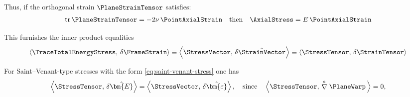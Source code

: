Thus, if the orthogonal strain \(\PlaneStrainTensor\) satisfies:
\begin{equation*}
\operatorname{tr}\PlaneStrainTensor = -2\nu\,\PointAxialStrain
\quad\text{then}\quad 
\AxialStress = E\,\PointAxialStrain
\end{equation*}


This furnishes the inner product equalities
\begin{equation*}
\left<\TraceTotalEnergyStress,\,\delta\FrameStrain\right>
\equiv \left<\StressVector,\, \delta \hat{\StrainVector}\right>
\equiv \left<\StressTensor ,\,\delta\StrainTensor\right>
\end{equation*}

For Saint–Venant-type stresses with the form \eqref{eq:saint-venant-stress} one has
\begin{equation}
\left<\StressTensor,\,\delta\hat{\bm{E}}\right>
=\left<\StressVector,\,\delta\hat{\bm{\varepsilon}}\right>,
\quad\text{since}\quad
\left<\StressTensor,\,\stackrel{\rm s}{\nabla}\PlaneWarp\,\right>=0,
\label{eq:sv-orthogonality}
\end{equation}

